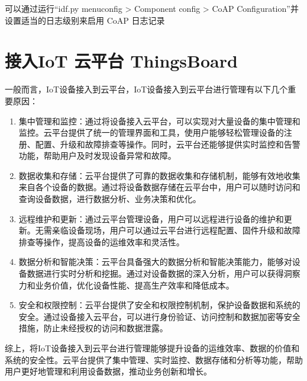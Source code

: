 \documentclass[a4paper,12pt,english]{sphinxmanual}
\begin{document}
{{\sphinxAtStartPar
可以通过运行“idf.py menuconfig \sphinxhyphen{}> Component config \sphinxhyphen{}> CoAP Configuration”并设置适当的日志级别来启用 CoAP 日志记录

\sphinxstepscope


\section{接入IoT 云平台 ThingsBoard}
\label{\detokenize{exp-esp32/iot-cloud:iot-thingsboard}}\label{\detokenize{exp-esp32/iot-cloud::doc}}
\sphinxAtStartPar
一般而言，IoT设备接入到云平台，IoT设备接入到云平台进行管理有以下几个重要原因：
\begin{enumerate}
%
\item {} 
\sphinxAtStartPar
集中管理和监控：通过将设备接入云平台，可以实现对大量设备的集中管理和监控。云平台提供了统一的管理界面和工具，使用户能够轻松管理设备的注册、配置、升级和故障排查等操作。同时，云平台还能够提供实时监控和告警功能，帮助用户及时发现设备异常和故障。

\item {} 
\sphinxAtStartPar
数据收集和存储：云平台提供了可靠的数据收集和存储机制，能够有效地收集来自各个设备的数据。通过将设备数据存储在云平台中，用户可以随时访问和查询设备数据，进行数据分析、业务决策和优化。

\item {} 
\sphinxAtStartPar
远程维护和更新：通过云平台管理设备，用户可以远程进行设备的维护和更新。无需亲临设备现场，用户可以通过云平台进行远程配置、固件升级和故障排查等操作，提高设备的运维效率和灵活性。

\item {} 
\sphinxAtStartPar
数据分析和智能决策：云平台具备强大的数据分析和智能决策能力，能够对设备数据进行实时分析和挖掘。通过对设备数据的深入分析，用户可以获得洞察力和业务价值，优化设备性能、提高生产效率和降低成本。

\item {} 
\sphinxAtStartPar
安全和权限控制：云平台提供了安全和权限控制机制，保护设备数据和系统的安全。通过设备接入云平台，可以进行身份验证、访问控制和数据加密等安全措施，防止未经授权的访问和数据泄露。

\end{enumerate}

\sphinxAtStartPar
综上，将IoT设备接入到云平台进行管理能够提升设备的运维效率、数据的价值和系统的安全性。云平台提供了集中管理、实时监控、数据存储和分析等功能，帮助用户更好地管理和利用设备数据，推动业务创新和增长。

}}
\end{document}
